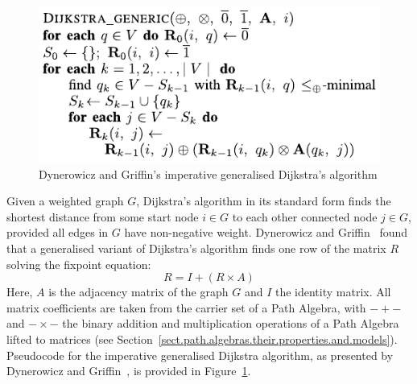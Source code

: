 \begin{figure}[ht]
\includegraphics{algorithm.pdf}
\caption{Dynerowicz and Griffin's imperative generalised Dijkstra's algorithm}
\label{fig.algorithm}
\end{figure}

Given a weighted graph $G$, Dijkstra's algorithm in its standard form finds the shortest distance from some start node $i \in G$ to each other connected node $j \in G$, provided all edges in $G$ have non-negative weight.
Dynerowicz and Griffin~\cite{dynerowicz_forwarding_2013} found that a generalised variant of Dijkstra's algorithm finds one row of the matrix $R$ solving the fixpoint equation:
\begin{displaymath}
R = I + (R \times A)
\end{displaymath}
Here, $A$ is the adjacency matrix of the graph $G$ and $I$ the identity matrix.
All matrix coefficients are taken from the carrier set of a Path Algebra, with $-+-$ and $-\times-$ the binary addition and multiplication operations of a Path Algebra lifted to matrices (see Section~\ref{sect.path.algebras.their.properties.and.models}).
Pseudocode for the imperative generalised Dijkstra algorithm, as presented by Dynerowicz and Griffin~\cite[pg. 9]{dynerowicz_forwarding_2013}, is provided in Figure~\ref{fig.algorithm}.

